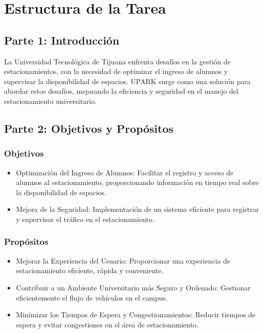 \documentclass{article}
\begin{document}
\section*{Estructura de la Tarea}

\subsection*{Parte 1: Introducción}
La Universidad Tecnológica de Tijuana enfrenta desafíos en la gestión de estacionamientos, con la necesidad de optimizar el ingreso de alumnos y supervisar la disponibilidad de espacios. UPARK surge como una solución para abordar estos desafíos, mejorando la eficiencia y seguridad en el manejo del estacionamiento universitario.

\subsection*{Parte 2: Objetivos y Propósitos}
\subsubsection*{Objetivos}
\begin{itemize}
    \item Optimización del Ingreso de Alumnos: Facilitar el registro y acceso de alumnos al estacionamiento, proporcionando información en tiempo real sobre la disponibilidad de espacios.
    \item Mejora de la Seguridad: Implementación de un sistema eficiente para registrar y supervisar el tráfico en el estacionamiento.
\end{itemize}

\subsubsection*{Propósitos}
\begin{itemize}
    \item Mejorar la Experiencia del Usuario: Proporcionar una experiencia de estacionamiento eficiente, rápida y conveniente.
    \item Contribuir a un Ambiente Universitario más Seguro y Ordenado: Gestionar eficientemente el flujo de vehículos en el campus.
    \item Minimizar los Tiempos de Espera y Congestionamientos: Reducir tiempos de espera y evitar congestiones en el área de estacionamiento.
\end{itemize}
\end{document}
